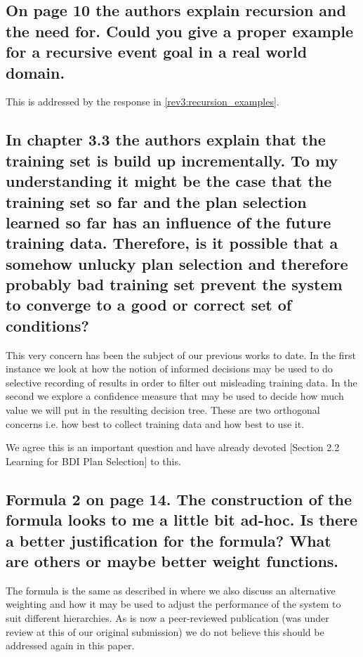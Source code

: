 \documentclass[preprint,12pt]{elsarticle}
\begin{document}
\subsection{On page 10 the authors explain recursion and the need for. Could you give a proper example for a recursive event goal in a real world domain.}

This is addressed by the response in \ref{rev3:recursion_examples}.

\subsection{In chapter 3.3 the authors explain that the training set is build up incrementally. To my understanding it might be the case that the training set so far and the plan selection learned so far has an influence of the future training data. Therefore, is it possible that a somehow unlucky plan selection and therefore probably bad training set prevent the system to converge to a good or correct set of conditions?}

This very concern has been the subject of our previous works \cite{Airiau:IJAT09,Singh:AAMAS10} to date. In the first instance \cite{Airiau:IJAT09} we look at how the notion of informed decisions may be used to do selective recording of results in order to filter out misleading training data. In the second \cite{Singh:AAMAS10} we explore a confidence measure that may be used to  decide how much value we will put in the resulting decision tree. These are two orthogonal concerns i.e. how best to collect training data and how best to use it.

We agree this is an important question and have already devoted [Section 2.2 Learning for BDI Plan Selection] to this.

\subsection{Formula 2 on page 14. The construction of the formula looks to me a little bit ad-hoc. Is there a better justification for the formula? What are others or maybe better weight functions.}

The formula is the same as described in \cite{Singh:AAMAS10} where we also discuss an alternative weighting and how it may be used to adjust the performance of the system to suit different hierarchies. As \cite{Singh:AAMAS10} is now a peer-reviewed publication (was under review at this of our original submission) we do not believe this should be addressed again in this paper.
\end{document}
